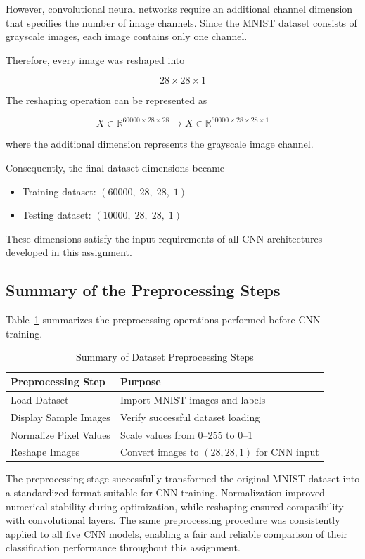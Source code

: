 However, convolutional neural networks require an additional channel dimension that specifies the number of image channels. Since the MNIST dataset consists of grayscale images, each image contains only one channel.

Therefore, every image was reshaped into

\[
28 \times 28 \times 1
\]

The reshaping operation can be represented as

\begin{equation}
X \in \mathbb{R}^{60000 \times 28 \times 28}
\rightarrow
X \in \mathbb{R}^{60000 \times 28 \times 28 \times 1}
\end{equation}

where the additional dimension represents the grayscale image channel.

Consequently, the final dataset dimensions became

\begin{itemize}
    \item Training dataset: $(60000,\;28,\;28,\;1)$
    \item Testing dataset: $(10000,\;28,\;28,\;1)$
\end{itemize}

These dimensions satisfy the input requirements of all CNN architectures developed in this assignment.

\subsection{Summary of the Preprocessing Steps}

Table~\ref{tab:preprocessing_summary} summarizes the preprocessing operations performed before CNN training.

\begin{table}[H]
\centering
\caption{Summary of Dataset Preprocessing Steps}\label{tab:preprocessing_summary}

\begin{tabular}{ll}
\toprule
\textbf{Preprocessing Step} & \textbf{Purpose} \\
\midrule
Load Dataset & Import MNIST images and labels \\
Display Sample Images & Verify successful dataset loading \\
Normalize Pixel Values & Scale values from 0--255 to 0--1 \\
Reshape Images & Convert images to $(28,28,1)$ for CNN input \\
\bottomrule
\end{tabular}

\end{table}

The preprocessing stage successfully transformed the original MNIST dataset into a standardized format suitable for CNN training. Normalization improved numerical stability during optimization, while reshaping ensured compatibility with convolutional layers. The same preprocessing procedure was consistently applied to all five CNN models, enabling a fair and reliable comparison of their classification performance throughout this assignment.